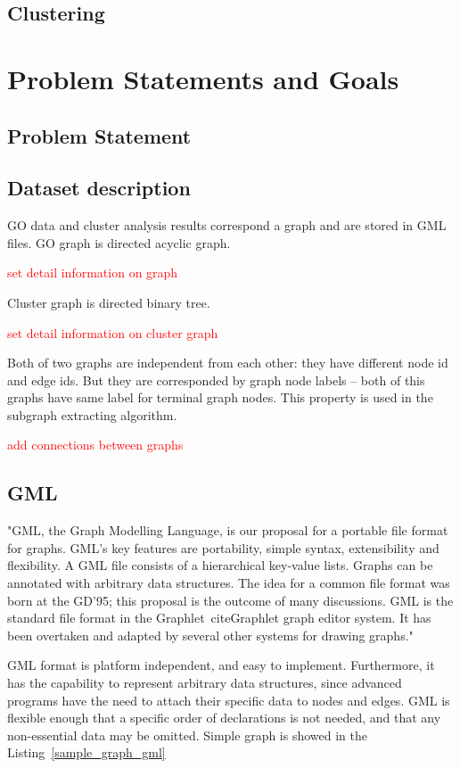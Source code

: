 \documentclass[a4paper,oneside]{article}
\newcommand*{\todo}[1]{
	\begin{LARGE}
		\textcolor{red}{#1}
	\end{LARGE}
}
\begin{document}
\subsection{Clustering}

\section{Problem Statements and Goals}

\subsection{Problem Statement}

\subsection{Dataset description}
GO data and cluster analysis results correspond a graph and are stored in GML files. GO graph is directed acyclic graph. \todo{set detail information on graph} Cluster graph is directed binary  tree. \todo{set detail information on cluster graph} Both of two graphs are independent from each other: they have different node id and edge ids. But they are corresponded by graph node labels -- both of this graphs have same label for terminal graph nodes. This property is used in the subgraph extracting algorithm. 

\todo{add connections between graphs}

\subsection{GML}
 "GML, the Graph Modelling Language, is our proposal for a portable file format for graphs. GML's key features are portability, simple syntax, extensibility and flexibility. A GML file consists of a hierarchical key-value lists. Graphs can be annotated with arbitrary data structures. The idea for a common file format was born at the GD'95; this proposal is the outcome of many discussions. GML is the standard file format in the Graphlet~cite{Graphlet} graph editor system. It has been overtaken and adapted by several other systems for drawing graphs."~\cite{GML}
 
 
GML format is platform independent, and easy to implement. Furthermore, it has the capability to represent arbitrary data structures, since advanced programs have the need to attach their specific data to nodes and edges. GML is flexible enough that a specific order of declarations is not needed, and that any non-essential data may be omitted. Simple graph is showed in the Listing~\ref{sample_graph_gml}
\end{document}

